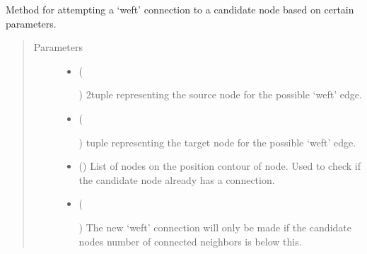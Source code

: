 \documentclass[letterpaper,10pt,english]{sphinxmanual}
\begin{document}
\begin{fulllineitems}
\begin{fulllineitems}
\end{fulllineitems}


\begin{fulllineitems}
\label{\detokenize{cockatoo:cockatoo.KnitNetwork.attempt_weft_connection}}
Method for attempting a ‘weft’ connection to a candidate
node based on certain parameters.
\begin{quote}\begin{description}
\item[{Parameters}] \leavevmode\begin{itemize}
\item {} 
 (%
\begin{footnote}[115]\sphinxAtStartFootnote
{}
%
\end{footnote}) \textendash{} 2\sphinxhyphen{}tuple representing the source node for the possible ‘weft’ edge.

\item {} 
 (%
\begin{footnote}[116]\sphinxAtStartFootnote
{}
%
\end{footnote}) \textendash{} \sphinxhyphen{}tuple representing the target node for the possible ‘weft’ edge.

\item {} 
 () \textendash{} List of nodes on the position contour of node. Used to check if
the candidate node already has a connection.

\item {} 
 (%
\begin{footnote}[117]\sphinxAtStartFootnote
{}
%
\end{footnote}\sphinxstyleliteralemphasis{\sphinxupquote{, }}) \textendash{} 
The new ‘weft’ connection will only be made if the candidate nodes
number of connected neighbors is below this.


\end{itemize}
\end{description}
\end{quote}
\end{fulllineitems}
\end{fulllineitems}
\end{document}
